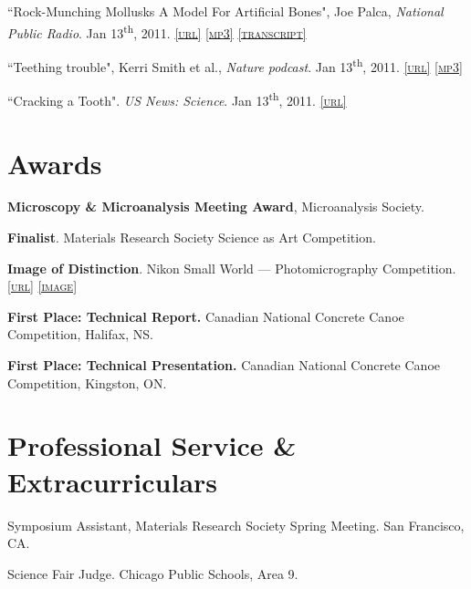 ``Rock-Munching Mollusks A Model For Artificial Bones", Joe Palca, \emph{National Public Radio}. Jan 13\textsuperscript{th}, 2011. \href{http://www.npr.org/2011/01/13/132859853/rock-munching-mollusks-a-model-for-artificial-bones}{\textsc{\footnotesize{[url]}}} \href{http://lylegordon.ca/audio/npr-2011-01-13.mp3}{\textsc{\footnotesize{[mp3]}}}  \href{http://lylegordon.ca/nprtranscript.html}{\textsc{\footnotesize{[transcript]}}}

``Teething trouble", Kerri Smith et al., \emph{Nature podcast}. Jan 13\textsuperscript{th}, 2011. \href{http://www.nature.com/nature/podcast/index-2011-01-13.html}{\textsc{\footnotesize{[url]}}} \href{http://lylegordon.ca/audio/nature-2011-01-13.mp3}{\textsc{\footnotesize{[mp3]}}}

 ``Cracking a Tooth". \emph{US News: Science}. Jan 13\textsuperscript{th}, 2011. \href{http://www.usnews.com/science/articles/2011/01/13/cracking-a-tooth}{\textsc{\footnotesize{[url]}}}
\endgroup

\section*{Awards}
\textbf{Microscopy \& Microanalysis Meeting Award}, Microanalysis Society.

\begingroup\setlength{\parskip}{0.1cm}
\textbf{Finalist}. Materials Research Society Science as Art Competition.

\textbf{Image of Distinction}. Nikon Small World --- Photomicrography Competition. \href{http://www.nikonsmallworld.com/detail/year/2009/66}{\textsc{\footnotesize{[url]}}} \href{http://lylegordon.ca/nikon2009.jpg}{\textsc{\footnotesize{[image]}}}

\textbf{First Place: Technical Report.} Canadian National Concrete Canoe Competition, Halifax, NS.

\textbf{First Place: Technical Presentation.} Canadian National Concrete Canoe Competition, Kingston, ON.
\endgroup

\section*{Professional Service \& Extracurriculars}
Symposium Assistant, Materials Research Society Spring Meeting. San Francisco, CA.

\begingroup\setlength{\parskip}{0.1cm}
Science Fair Judge. Chicago Public Schools, Area 9.

